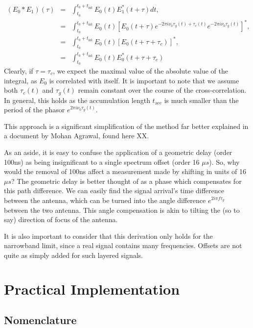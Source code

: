 \begin{eqnarray}
    (E_0*E_1)(\tau) &=& \int^{t_0 + t_{\text{int}}}_{t_0} E_0(t) E_1^*(t+\tau) dt, \\\nonumber
    &=& \int^{t_0 + t_{\text{int}}}_{t_0} E_0(t) {\left[ E_0(t+\tau) e^{-2\pi i \nu_0 \tau_g(t) + \tau_c(t)} e^{-2\pi i \nu_0 \tau_g(t) } \right]}^* , \\\nonumber
    &=& \int^{t_0 + t_{\text{int}}}_{t_0} E_0(t) {\left[ E_0(t + \tau + \tau_c) \right]}^ *, \\\nonumber
    &=& \int^{t_0 + t_{\text{int}}}_{t_0} E_0(t)  E_0^*(t + \tau + \tau_c)
\end{eqnarray}
Clearly, if $\tau = \tau_c$, we expect the maximal value of the absolute value of the integral, as $E_0$ is correlated with itself. 
It is important to note that we assume both $\tau_c(t)$ and $\tau_g(t)$ remain constant over the course of the cross-correlation.
In general, this holds as the accumulation length $t_{\text{acc}}$ is much smaller than the period of the phasor $e^{2\pi i \nu_0 \tau_g(t)}$.

This approach is a significant simplification of the method far better explained in a document by Mohan Agrawal, found here XX. 

 
As an aside, it is easy to confuse the application of a geometric delay (order 100ns) as being insignificant to a single spectrum
offset (order 16 $\mu s$).
So, why would the removal of 100ns affect a measurement made by shifting in units of 16 $\mu s$?
The geometric delay is better thought of as a phase which compensates for this path difference.
We can easily find the signal arrival's time difference between the antenna, which can be turned into the angle difference
$e^{2 i \pi f \tau_g}$ between the two antenna.
This angle compensation is akin to tilting the (so to say) direction of focus of the antenna.

It is also important to consider that this derivation only holds for the narrowband limit, since a real signal
contains many frequencies. 
Offsets are not quite as simply added for such layered signals.



\section{Practical Implementation}

\subsection{Nomenclature}

